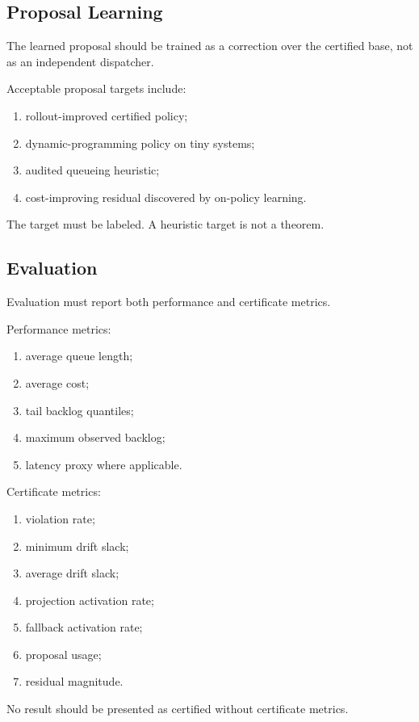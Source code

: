\documentclass[a4paper,11pt]{article}
\theoremstyle{definition}
\begin{document}
\subsection{Proposal Learning}

The learned proposal should be trained as a correction over the certified base,
not as an independent dispatcher.

Acceptable proposal targets include:
\begin{enumerate}
  \item rollout-improved certified policy;
  \item dynamic-programming policy on tiny systems;
  \item audited queueing heuristic;
  \item cost-improving residual discovered by on-policy learning.
\end{enumerate}
The target must be labeled. A heuristic target is not a theorem.

\subsection{Evaluation}

Evaluation must report both performance and certificate metrics.

Performance metrics:
\begin{enumerate}
  \item average queue length;
  \item average cost;
  \item tail backlog quantiles;
  \item maximum observed backlog;
  \item latency proxy where applicable.
\end{enumerate}

Certificate metrics:
\begin{enumerate}
  \item violation rate;
  \item minimum drift slack;
  \item average drift slack;
  \item projection activation rate;
  \item fallback activation rate;
  \item proposal usage;
  \item residual magnitude.
\end{enumerate}

No result should be presented as certified without certificate metrics.
\end{document}
